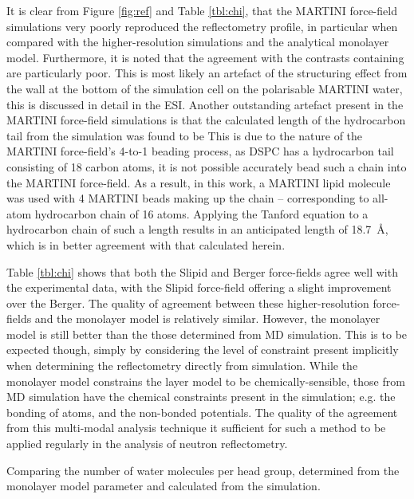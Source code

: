 \documentclass[twoside,twocolumn,9pt]{article}
\begin{document}
It is clear from Figure \ref{fig:ref} and Table \ref{tbl:chi}, that the MARTINI force-field simulations very poorly reproduced the reflectometry profile, in particular when compared with the higher-resolution simulations and the analytical monolayer model.
Furthermore, it is noted that the agreement with the contrasts containing  are particularly poor.
This is most likely an artefact of the structuring effect from the wall at the bottom of the simulation cell on the polarisable MARTINI water, this is discussed in detail in the ESI.
Another outstanding artefact present in the MARTINI force-field simulations is that the calculated length of the hydrocarbon tail from the simulation was found to be %
This is due to the nature of the MARTINI force-field's 4-to-1 beading process, as DSPC has a hydrocarbon tail consisting of 18 carbon atoms, it is not possible accurately bead such a chain into the MARTINI force-field.
As a result, in this work, a MARTINI lipid molecule was used with 4 MARTINI beads making up the chain -- corresponding to all-atom hydrocarbon chain of 16 atoms.
Applying the Tanford equation to a hydrocarbon chain of such a length results in an anticipated length of \SI{18.7}{\angstrom}, which is in better agreement with that calculated herein.

Table \ref{tbl:chi} shows that both the Slipid and Berger force-fields agree well with the experimental data, with the Slipid force-field offering a slight improvement over the Berger.
The quality of agreement between these higher-resolution force-fields and the monolayer model is relatively similar.
However, the monolayer model is still better than the those determined from MD simulation.
This is to be expected though, simply by considering the level of constraint present implicitly when determining the reflectometry directly from simulation.
While the monolayer model constrains the layer model to be chemically-sensible, those from MD simulation have the chemical constraints present in the simulation; e.g. the bonding of atoms, and the non-bonded potentials.
The quality of the agreement from this multi-modal analysis technique it sufficient for such a method to be applied regularly in the analysis of neutron reflectometry.

Comparing the number of water molecules per head group, determined from the monolayer model parameter and calculated from the simulation.
\end{document}
